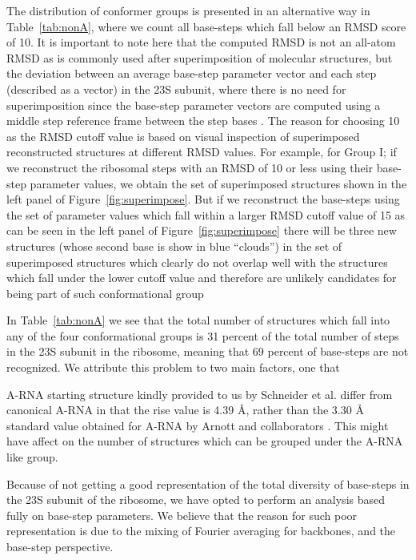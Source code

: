 The distribution  of conformer groups  is presented in  an alternative
way in Table~\ref{tab:nonA}, where  we count all base-steps which fall
below an  RMSD score  of 10.  It  is important  to note here  that the
computed  RMSD is  not  an all-atom  RMSD  as is  commonly used  after
superimposition of molecular structures,  but the deviation between an
average  base-step parameter  vector  and each  step  (described as  a
vector) in the 23S subunit, where there is no need for superimposition
since the base-step parameter vectors are computed using a middle step
reference frame between the step bases \cite{lu2003a}.  The reason for
choosing 10 as the RMSD cutoff  value is based on visual inspection of
superimposed  reconstructed structures at  different RMSD  values. For
example, for  Group I; if we  reconstruct the ribosomal  steps with an
RMSD of 10  or less using their base-step  parameter values, we obtain
the  set  of  superimposed  structures  shown in  the  left  panel  of
Figure~\ref{fig:superimpose}.   But if  we reconstruct  the base-steps
using  the set of  parameter values  which fall  within a  larger RMSD
cutoff  value   of  15  as   can  be  seen   in  the  left   panel  of
Figure~\ref{fig:superimpose} there will be three new structures (whose
second base  is show  in blue ``clouds'')  in the set  of superimposed
structures which clearly do not overlap well with the structures which
fall  under  the  lower   cutoff  value  and  therefore  are  unlikely
candidates for being part of such conformational group

  

In  Table~\ref{tab:nonA} we see  that the  total number  of structures
which fall into any of the four conformational groups is 31 percent of
the total number of steps in  the 23S subunit in the ribosome, meaning
that 69  percent of base-steps  are not recognized. We  attribute this
problem to two main factors, one that 

A-RNA starting structure  kindly provided to  us by
Schneider et al. differ from canonical A-RNA in that the rise value is
4.39 \AA, rather than the  3.30 \AA~ standard value obtained for A-RNA
by Arnott and collaborators  \cite{arnott1973}. This might have affect
on the number of structures which  can be grouped under the A-RNA like
group.

Because of not getting a good representation of the total diversity of
base-steps  in the  23S  subunit of  the  ribosome, we  have opted  to
perform an  analysis based fully  on base-step parameters.  We believe
that the reason  for such poor representation is due  to the mixing of
Fourier averaging for backbones, and  the base-step perspective.

